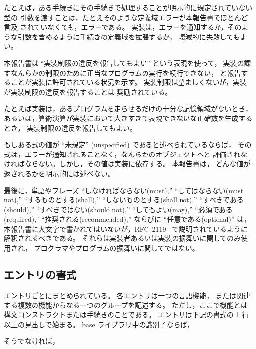 たとえば，ある手続きにその手続きで処理することが明示的に規定されていない型の
引数を渡すことは，たとえそのような定義域エラーが本報告書でほとんど言及
されていなくても，エラーである。
実装は，エラーを通知するか，そのような引数を含めるように手続きの定義域を拡張するか，
壊滅的に失敗してもよい。

\vest 本報告書は ``実装制限の違反を報告してもよい'' という表現を使って，
実装の課すなんらかの制限のために正当なプログラムの実行を続行できない，
と報告することが実装に許可されている状況を示す。
実装制限は望ましくないが，実装が実装制限の違反を報告することは
奨励されている。

\vest たとえば実装は，あるプログラムを走らせるだけの十分な記憶領域がないとき，
あるいは，算術演算が実装において大きすぎて表現できないな正確数を生成するとき，
実装制限の違反を報告してもよい。

\vest もしある式の値が ``未規定'' (unspecified) であると述べられているならば，
その式は，エラーが通知されることなく，なんらかのオブジェクトへと
評価されなければならない。しかし，その値は実装に依存する。
本報告書は，
どんな値が返されるかを明示的には述べない。

\vest 最後に，単語やフレーズ ``しなければならない(must),'' ``してはならない(must not),''
``するものとする(shall),'' ``しないものとする(shall not),'' ``すべきである(should),''
``すべきではない(should not),'' ``してもよい(may),'' ``必須である(required),''
``推奨される(recommended),'' ならびに ``任意である(optional)''
は，本報告書に大文字で書かれてはいないが，RFC~2119~\cite{rfc2119} で説明されているように
解釈されるべきである。
それらは実装者あるいは実装の振舞いに関してのみ使用され，
プログラマやプログラムの振舞いに関してではない。



\subsection{エントリの書式}

エントリごとにまとめられている。
各エントリは一つの言語機能，
または関連する複数の機能からなる一つのグループを記述する。
ただし，ここで機能とは構文コンストラクトまたは手続きのことである。
エントリは下記の書式の 1 行以上の見出しで始まる。
base ライブラリ中の識別子ならば，


\noindent{}\unpenalty

そうでなければ，

\noindent{}\unpenalty

